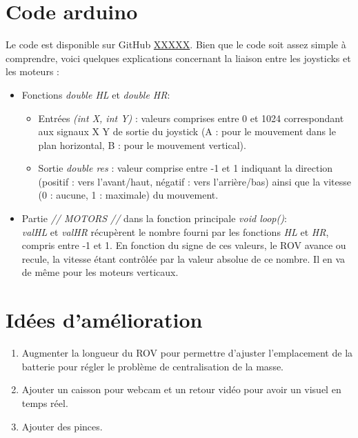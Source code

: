 \documentclass[11pt,a4paper]{article}
\begin{document}
      
    \section{Code arduino}
        Le code est disponible sur GitHub \url{XXXXX}. Bien que le code soit assez simple à comprendre, voici quelques explications concernant la liaison entre les joysticks et les moteurs :
        \begin{itemize}
          \item Fonctions \emph{double HL} et \emph{double HR}:
            \begin{itemize}
              \item Entrées \emph{(int X, int Y)} : valeurs comprises entre 0 et 1024 correspondant aux signaux X Y de sortie du joystick (A : pour le mouvement dans le plan horizontal, B : pour le mouvement vertical).
              \item Sortie  \emph{double res} : valeur comprise entre -1 et 1 indiquant la direction (positif : vers l'avant/haut, négatif : vers l'arrière/bas) ainsi que la vitesse (0 : aucune, 1 : maximale) du mouvement.
            \end{itemize}
            \item Partie \emph{// MOTORS //} dans la fonction principale \emph{void loop()}:\\ \emph{valHL} et \emph{valHR} récupèrent le nombre fourni par les fonctions \emph{HL} et \emph{HR}, compris entre -1 et 1. En fonction du signe de ces valeurs, le ROV avance ou recule, la vitesse étant contrôlée par la valeur absolue de ce nombre. Il en va de même pour les moteurs verticaux.
        \end{itemize}
    
    \section{Idées d'amélioration}
      \begin{enumerate}
        \item Augmenter la longueur du ROV pour permettre d'ajuster l'emplacement de la batterie pour régler le problème de centralisation de la masse.
        \item Ajouter un caisson pour webcam et un retour vidéo pour avoir un visuel en temps réel.
        \item Ajouter des pinces.
      \end{enumerate}


  \renewcommand\refname{Sources}
  
  
      
\end{document}
